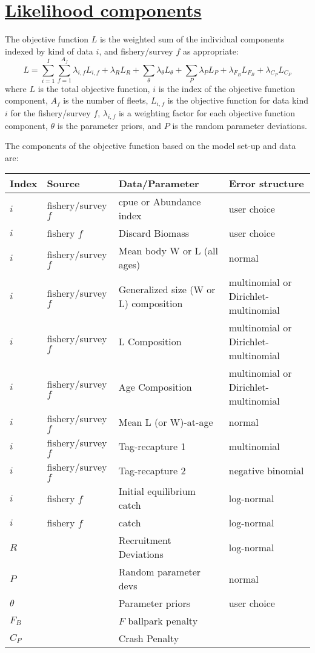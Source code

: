 \hypertarget{LikeComp}{}
\section[Likelihood components]{\protect\hyperlink{LikeComp}{Likelihood components}}

The objective function $L$ is the weighted sum of the individual components
indexed by kind of data $i$, and fishery/survey $f$ as appropriate:
\begin{equation}
	L = \sum_{i=1}^{I}\sum_{f=1}^{A_f}\lambda_{i,f} L_{i,f}+\lambda_R L_R + 
	  \sum_{\theta}^{}\lambda_\theta L_\theta + \sum_{P}^{}\lambda_P L_P +
	  \lambda_{F_B} L_{F_B} + \lambda_{C_P} L_{C_P}
\end{equation}
where $L$ is the total objective function, $i$ is the index of the objective
function component, $A_f$ is the number of fleets, $L_{i,f}$ is the
objective function for data kind $i$ for the fishery/survey $f$,
$\lambda_{i,f}$ is a weighting factor for each objective function component,
$\theta$ is the parameter priors, and $P$ is the random parameter deviations.

The components of the objective function based on the model set-up and data are: 
\begin{longtable}{p{1cm} p{3.9cm} p{3.9cm} p{6cm}}
	\hline
	Index & Source & Data/Parameter & Error structure \Tstrut\Bstrut\\
	\hline	
	$i$ & fishery/survey $f$ & \gls{cpue} or Abundance index & user choice \Tstrut\\
	$i$ & fishery $f$ & Discard Biomass & user choice \Tstrut\\
	$i$ & fishery/survey $f$ & Mean body W or L (all ages) & normal \Tstrut\\
	$i$ & fishery/survey $f$ & Generalized size (W or L) composition & multinomial or Dirichlet-multinomial \Tstrut\\
	$i$ & fishery/survey $f$ & L Composition & multinomial or Dirichlet-multinomial \Tstrut\\
	$i$ & fishery/survey $f$ & Age Composition & multinomial or Dirichlet-multinomial \Tstrut\\
	$i$ & fishery/survey $f$ & Mean L (or W)-at-age & normal \Tstrut\\
	$i$ & fishery/survey $f$ & Tag-recapture 1 & multinomial \Tstrut\\
	$i$ & fishery/survey $f$ & Tag-recapture 2 & negative binomial \Tstrut\\
	$i$ & fishery $f$ & Initial equilibrium catch & log-normal \Tstrut\\
	$i$ & fishery $f$ & catch & log-normal \Tstrut\\
	$R$ & & Recruitment Deviations & log-normal \Tstrut\\
	$P$ & & Random parameter devs & normal \Tstrut\\
	$\theta$ & & Parameter priors & user choice \Tstrut\\
	$F_B$ & & $F$ ballpark penalty & \Tstrut\\
	$C_P$ &	& Crash Penalty	& \Tstrut\Bstrut\\
	\hline
\end{longtable}

